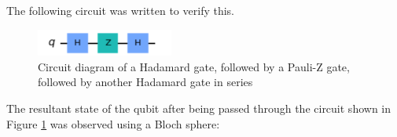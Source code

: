 The following circuit was written to verify this.

\begin{figure}[h]
    \centering
    \includegraphics[width=0.4\textwidth]{lab2/images/hzhCircuit.png}
    \captionsetup{font = it, labelfont = bf, width=.91\linewidth, justification=centering}
    \caption{Circuit diagram of a Hadamard gate, followed by a Pauli-Z gate, followed by another Hadamard gate in series} 
    \label{fig:hzhCircuit}
\end{figure}

The resultant state of the qubit after being passed through the circuit shown in Figure \ref{fig:hzhCircuit} was observed using a Bloch sphere:

